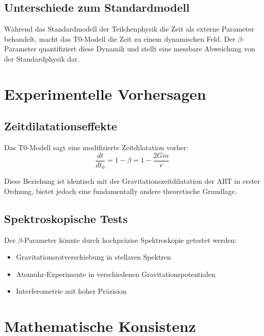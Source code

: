 	\subsection{Unterschiede zum Standardmodell}
	\label{subsec:sm_differences}
	
	Während das Standardmodell der Teilchenphysik die Zeit als externe Parameter behandelt, macht das T0-Modell die Zeit zu einem dynamischen Feld. Der $\beta$-Parameter quantifiziert diese Dynamik und stellt eine messbare Abweichung von der Standardphysik dar.
	
	\section{Experimentelle Vorhersagen}
	\label{sec:experimental_predictions}
	
	\subsection{Zeitdilatationseffekte}
	\label{subsec:time_dilation}
	
	Das T0-Modell sagt eine modifizierte Zeitdilatation vorher:
	\begin{equation}
		\frac{dt}{dt_0} = 1 - \beta = 1 - \frac{2Gm}{r}
	\end{equation}
	
	Diese Beziehung ist identisch mit der Gravitationszeitdilatation der ART in erster Ordnung, bietet jedoch eine fundamentally andere theoretische Grundlage.
	
	\subsection{Spektroskopische Tests}
	\label{subsec:spectroscopic_tests}
	
	Der $\beta$-Parameter könnte durch hochpräzise Spektroskopie getestet werden:
	\begin{itemize}
		\item Gravitationsrotverschiebung in stellaren Spektren
		\item Atomuhr-Experimente in verschiedenen Gravitationspotentialen
		\item Interferometrie mit hoher Präzision
	\end{itemize}
	
	\section{Mathematische Konsistenz}
	\label{sec:mathematical_consistency}
	
